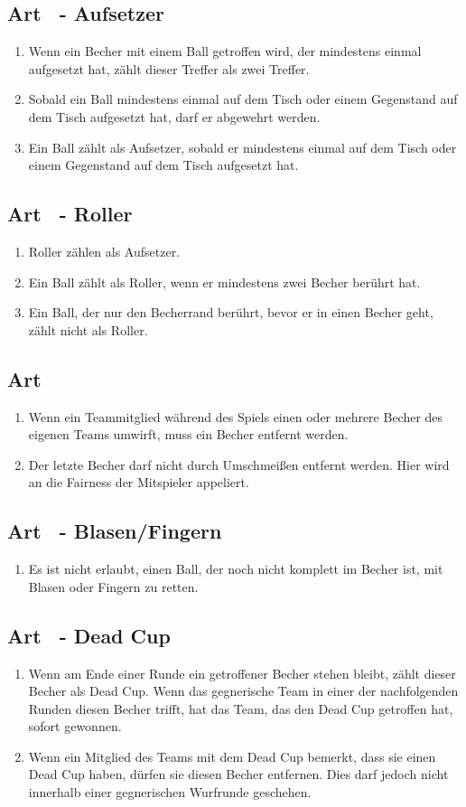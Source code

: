 \documentclass[a4paper,11pt]{scrartcl}
\newcommand{\enum}[1]{\begin{enumerate}[label=(\arabic*)]#1\end{enumerate}}
\newcommand{\art}[2]{\subsection*{#1} \enum{#2}}
\newcommand{\quot}[1]{\glqq #1\grqq}
\newcounter{art}
\begin{document}
    \art{Art \theart\ - Aufsetzer}{
        \item
            Wenn ein Becher mit einem Ball getroffen wird, der mindestens einmal aufgesetzt hat, zählt dieser Treffer als zwei Treffer.
        \item
            Sobald ein Ball mindestens einmal auf dem Tisch oder einem Gegenstand auf dem Tisch aufgesetzt hat, darf er abgewehrt werden.
        \item
            Ein Ball zählt als Aufsetzer, sobald er mindestens einmal auf dem Tisch oder einem Gegenstand auf dem Tisch aufgesetzt hat.
    }

    \art{Art \theart\ - Roller}{
        \item
            Roller zählen als Aufsetzer.
        \item
            Ein Ball zählt als Roller, wenn er mindestens zwei Becher berührt hat.
        \item
            Ein Ball, der nur den Becherrand berührt, bevor er in einen Becher geht, zählt nicht als Roller.
    }

    \art{Art \theart}{
        \item
            Wenn ein Teammitglied während des Spiels einen oder mehrere Becher des eigenen Teams umwirft, muss ein Becher entfernt werden.
        \item
            Der letzte Becher darf nicht durch Umschmeißen entfernt werden. Hier wird an die Fairness der Mitspieler appeliert.
    }

    \art{Art \theart\ - \quot{Blasen/Fingern}}{
        \item
            Es ist nicht erlaubt, einen Ball, der noch nicht komplett im Becher ist, mit \quot{Blasen} oder \quot{Fingern} zu retten.
    }

    \art{Art \theart\ - \quot{Dead Cup}}{
        \item
            Wenn am Ende einer Runde ein getroffener Becher stehen bleibt, zählt dieser Becher als \quot{Dead Cup}. Wenn das gegnerische Team in einer der nachfolgenden Runden diesen Becher trifft, hat das Team, das den \quot{Dead Cup} getroffen hat, sofort gewonnen.
        \item
            Wenn ein Mitglied des Teams mit dem \quot{Dead Cup} bemerkt, dass sie einen \quot{Dead Cup} haben, dürfen sie diesen Becher entfernen. Dies darf jedoch nicht innerhalb einer gegnerischen Wurfrunde geschehen.
    }
\end{document}

